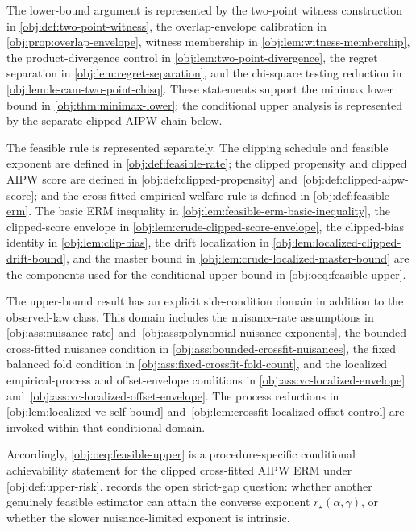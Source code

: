 \documentclass[11pt]{article}
\begin{document}
The lower-bound argument is represented by the two-point witness construction in \cref{obj:def:two-point-witness}, the overlap-envelope calibration in \cref{obj:prop:overlap-envelope}, witness membership in \cref{obj:lem:witness-membership}, the product-divergence control in \cref{obj:lem:two-point-divergence}, the regret separation in \cref{obj:lem:regret-separation}, and the chi-square testing reduction in \cref{obj:lem:le-cam-two-point-chisq}.  These statements support the minimax lower bound in \cref{obj:thm:minimax-lower}; the conditional upper analysis is represented by the separate clipped-AIPW chain below.

The feasible rule is represented separately.  The clipping schedule and feasible exponent are defined in \cref{obj:def:feasible-rate}; the clipped propensity and clipped AIPW score are defined in \cref{obj:def:clipped-propensity} and~\cref{obj:def:clipped-aipw-score}; and the cross-fitted empirical welfare rule is defined in \cref{obj:def:feasible-erm}.  The basic ERM inequality in \cref{obj:lem:feasible-erm-basic-inequality}, the clipped-score envelope in \cref{obj:lem:crude-clipped-score-envelope}, the clipped-bias identity in \cref{obj:lem:clip-bias}, the drift localization in \cref{obj:lem:localized-clipped-drift-bound}, and the master bound in \cref{obj:lem:crude-localized-master-bound} are the components used for the conditional upper bound in \cref{obj:oeq:feasible-upper}.

The upper-bound result has an explicit side-condition domain in addition to the observed-law class.  This domain includes the nuisance-rate assumptions in \cref{obj:ass:nuisance-rate} and~\cref{obj:ass:polynomial-nuisance-exponents}, the bounded cross-fitted nuisance condition in \cref{obj:ass:bounded-crossfit-nuisances}, the fixed balanced fold condition in \cref{obj:ass:fixed-crossfit-fold-count}, and the localized empirical-process and offset-envelope conditions in \cref{obj:ass:vc-localized-envelope} and~\cref{obj:ass:vc-localized-offset-envelope}.  The process reductions in \cref{obj:lem:localized-vc-self-bound} and~\cref{obj:lem:crossfit-localized-offset-control} are invoked within that conditional domain.

Accordingly, \cref{obj:oeq:feasible-upper} is a procedure-specific conditional achievability statement for the clipped cross-fitted AIPW ERM under \cref{obj:def:upper-risk}.   records the open strict-gap question: whether another genuinely feasible estimator can attain the converse exponent \(r_\star(\alpha,\gamma)\), or whether the slower nuisance-limited exponent is intrinsic.
\end{document}
